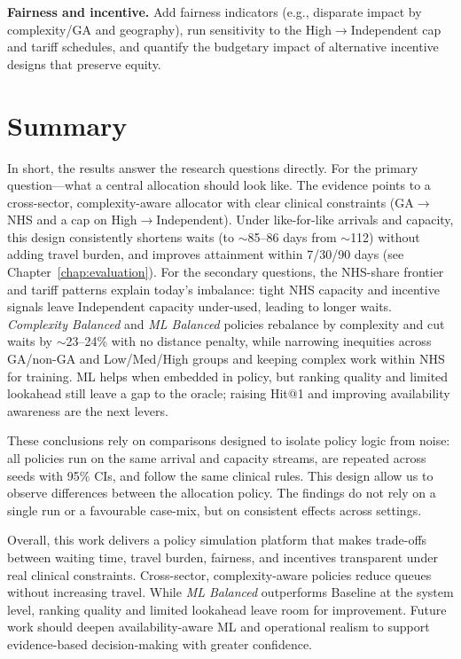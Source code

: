 \documentclass[ %
                    author={Nattanan Nawakitbamrung},
                supervisor={Dr. Sébastien Rochat},
                    degree={MSc},
                     title={Developing and Evaluating the Impact of a Single Patient Treatment List (PTL) for an NHS Integrated Care System},
                  subtitle={},
                      type={},
                      year={2025}]{dissertation}
\begin{document}
\textbf{Fairness and incentive.} Add fairness indicators (e.g., disparate impact by complexity/GA and geography), run sensitivity to the High$\rightarrow$Independent cap and tariff schedules, and quantify the budgetary impact of alternative incentive designs that preserve equity.

\section{Summary}

In short, the results answer the research questions directly. For the primary question—what a central allocation should look like. The evidence points to a cross-sector, complexity-aware allocator with clear clinical constraints (GA$\rightarrow$NHS and a cap on High$\rightarrow$Independent). Under like-for-like arrivals and capacity, this design consistently shortens waits (to $\sim$85–86 days from $\sim$112) without adding travel burden, and improves attainment within 7/30/90 days (see Chapter~\ref{chap:evaluation}). For the secondary questions, the NHS-share frontier and tariff patterns explain today’s imbalance: tight NHS capacity and incentive signals leave Independent capacity under-used, leading to longer waits. \textit{Complexity Balanced} and \textit{ML Balanced} policies rebalance by complexity and cut waits by $\sim$23–24\% with no distance penalty, while narrowing inequities across GA/non-GA and Low/Med/High groups and keeping complex work within NHS for training. ML helps when embedded in policy, but ranking quality and limited lookahead still leave a gap to the oracle; raising Hit@1 and improving availability awareness are the next levers.

These conclusions rely on comparisons designed to isolate policy logic from noise: all policies run on the same arrival and capacity streams, are repeated across seeds with 95\% CIs, and follow the same clinical rules. This design allow us to observe differences between the allocation policy. The findings do not rely on a single run or a favourable case-mix, but on consistent effects across settings.

Overall, this work delivers a policy simulation platform that makes trade-offs between waiting time, travel burden, fairness, and incentives transparent under real clinical constraints. Cross-sector, complexity-aware policies reduce queues without increasing travel. While \textit{ML Balanced} outperforms Baseline at the system level, ranking quality and limited lookahead leave room for improvement. Future work should deepen availability-aware ML and operational realism to support evidence-based decision-making with greater confidence.
\end{document}
